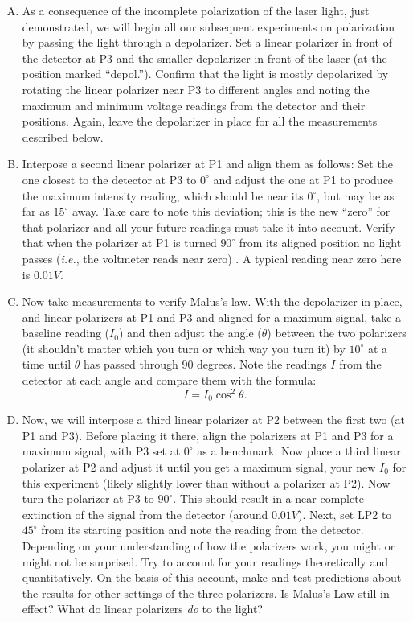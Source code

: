 \begin{enumerate}[(A)]
\item As a consequence of the incomplete polarization of the laser light, just demonstrated, we will begin all our subsequent experiments on polarization by passing the light through a depolarizer. Set a linear polarizer in front of the detector at P3 and the smaller depolarizer in front of the laser (at the position marked ``depol.''). Confirm that the light is mostly depolarized by rotating the linear polarizer near P3 to different angles and noting the maximum and minimum voltage readings from the detector and their positions. Again, leave the depolarizer in place for all the measurements described below.


\item Interpose a second linear polarizer at P1 and align them as follows: Set the one closest to the detector at P3 to $0^{\circ}$ and adjust the one at P1 to produce the maximum intensity reading, which should be near its $0^{\circ}$, but may be as far as $15^\circ$ away. Take care to note this deviation; this is the new ``zero'' for that polarizer and all your future readings must take it into account. Verify that when the polarizer at P1 is turned $90^{\circ}$ from its aligned position no light passes (\emph{i.e.}, the voltmeter reads near zero) . A typical reading near zero here is $0.01V$.

\item Now take measurements to verify Malus's law.  With the depolarizer in place, and linear polarizers at P1 and P3 and aligned for a maximum signal, take a baseline reading ($I_0$) and then adjust the angle ($\theta$) between the two polarizers (it shouldn't matter which you turn or which way you 
turn it) by $10^{\circ}$ at a time until $\theta$ has passed through $90$ degrees. Note the readings $I$ from the detector at each angle and compare them with the formula:
\begin{equation*}
I = I_0 \cos^{2} \theta.
\end{equation*}

\item Now, we will interpose a third linear polarizer at P2 between the first two (at P1 and P3). Before placing it there, align the polarizers at P1 and P3 for a maximum signal, with P3 set at $0^\circ$ as a benchmark. Now place a third linear polarizer at P2 and adjust it until you get a maximum signal, your new $I_0$ for this experiment (likely slightly lower than without a polarizer at P2). Now turn the polarizer at P3 to $90^{\circ}$. This 
should result in a near-complete extinction of the signal from the detector (around $0.01V$). Next, set LP2 to $45^{\circ}$ from its starting position and note the reading from the detector. Depending on your understanding of how the polarizers work, you might or might not be surprised. Try to account for your readings theoretically and quantitatively. On the basis of this account, make and test predictions about the results for other settings of the three polarizers. Is Malus's Law still in effect? What do linear polarizers \emph{do} to the light?


\end{enumerate}
